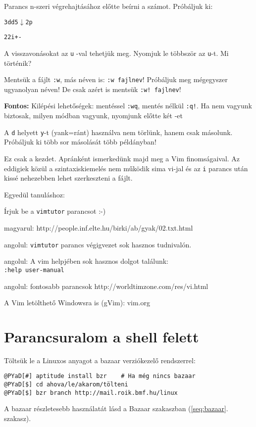 \documentclass[a4paper]{article}
\newcommand{\code}{\texttt}
\newcommand{\Esc}{\framebox{\texttt{Esc}}}
\begin{document}
Parancs n-szeri végrehajtásához előtte beírni a számot. Próbáljuk ki:

\code{3dd5$\downarrow$2p}

\code{22i+-} \Esc

A visszavonásokat az \code{u} -val tehetjük meg. Nyomjuk le többször az
\code{u}-t. Mi történik?

Mentsük a fájlt \code{:w}, más néven is: \code{:w fajlnev}! Próbáljuk
meg mégegyszer ugyanolyan néven! De csak azért is mentsük \code{:w! fajlnev}!

\textbf{Fontos:} Kilépési lehetőségek: mentéssel \code{:wq}, mentés nélkül
\code{:q!}. Ha nem vagyunk biztosak, milyen módban vagyunk, nyomjunk
előtte két \Esc-et

A \code{d} helyett \code{y}-t (yank=ránt) használva nem törlünk, hanem csak
másolunk. Próbáljuk ki több sor másolását több példányban!

Ez csak a kezdet. Apránként ismerkedünk majd meg a Vim finomságaival.
Az eddigiek közül a szintaxiskiemelés nem működik sima vi-jal és az
\code{i} parancs után kissé nehezebben lehet szerkeszteni a fájlt.

Egyedül tanuláshoz:

Írjuk be a \code{vimtutor} parancsot :-)

magyarul: http://people.inf.elte.hu/birki/ab/gyak/02.txt.html

angolul: \code{vimtutor} parancs végigvezet sok hasznos tudnivalón.

angolul: A vim helpjében sok hasznos dolgot találunk:\\ \verb!:help user-manual!

angolul: fontosabb parancsok http://worldtimzone.com/res/vi.html

A Vim letölthető Windowsra is (gVim): vim.org

\newpage
\section{Parancsuralom a shell felett}

Töltsük le a Linuxos anyagot a bazaar verziókezelő rendszerrel:
\begin{Verbatim}[commandchars=@\[\]]
@PYaD[#] aptitude install bzr    # Ha még nincs bazaar
@PYaD[$] cd ahova/le/akarom/tölteni
@PYaD[$] bzr branch http://mail.roik.bmf.hu/linux
\end{Verbatim}

A bazaar részletesebb használatát lásd a Bazaar szakaszban
(\ref{seq:bazaar}. szakasz).
\end{document}
